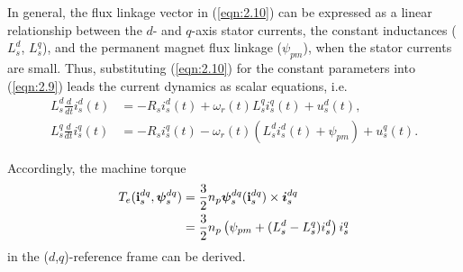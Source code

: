 In general, the flux linkage vector in (\ref{eqn:2.10}) can be expressed as a linear relationship between the $d$- and $q$-axis stator currents, the constant inductances ($L^d_s$, $L^q_s$), and the permanent magnet flux linkage ($\psi_{pm}$), when the stator currents are small. Thus, substituting (\ref{eqn:2.10}) for the constant parameters into (\ref{eqn:2.9}) leads the current dynamics as scalar equations, i.e.
\begin{align}\label{eqn:2.12}
L^d_s \frac{d}{dt}i^d_s(t) &= -R_s i^d_s(t) + \omega_r(t) L^q_s i^q_s(t) + u^d_s(t), \\\label{eqn:2.13}
L^q_s \frac{d}{dt}i^q_s(t) &= -R_s i^q_s(t) - \omega_r(t) (L^d_s i^d_s(t) + \psi_{pm}) + u^q_s(t).
\end{align}

Accordingly, the machine torque 
\begin{align}\notag
T_e(\mathbf{i}^{dq}_s,\bm{\psi}^{dq}_{s}) &= \frac{3}{2}n_p \bm{\psi}^{dq}_{s}(\mathbf{i}^{dq}_s) \times \bm{i}^{dq}_s \\\label{eqn:2.14}
&= \frac{3}{2}n_p  \left( \psi_{pm} + (L^d_s - L^q_s) i^d_s\right)i^q_s
\end{align}
in the ($d$,$q$)-reference frame can be derived. 

